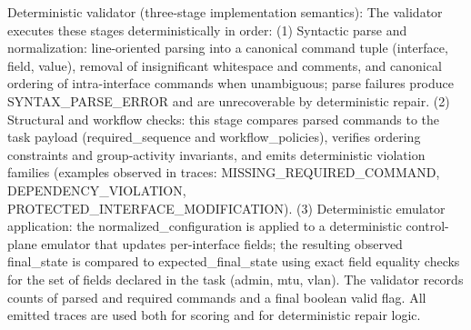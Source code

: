 \documentclass[conference]{IEEEtran}
\begin{document}
Deterministic validator (three-stage implementation semantics): The validator executes these stages deterministically in order: (1) Syntactic parse and normalization: line-oriented parsing into a canonical command tuple (interface, field, value), removal of insignificant whitespace and comments, and canonical ordering of intra-interface commands when unambiguous; parse failures produce SYNTAX\_PARSE\_ERROR and are unrecoverable by deterministic repair. (2) Structural and workflow checks: this stage compares parsed commands to the task payload (required\_sequence and workflow\_policies), verifies ordering constraints and group-activity invariants, and emits deterministic violation families (examples observed in traces: MISSING\_REQUIRED\_COMMAND, DEPENDENCY\_VIOLATION, PROTECTED\_INTERFACE\_MODIFICATION). (3) Deterministic emulator application: the normalized\_configuration is applied to a deterministic control-plane emulator that updates per-interface fields; the resulting observed final\_state is compared to expected\_final\_state using exact field equality checks for the set of fields declared in the task (admin, mtu, vlan). The validator records counts of parsed and required commands and a final boolean valid flag. All emitted traces are used both for scoring and for deterministic repair logic.
\end{document}

